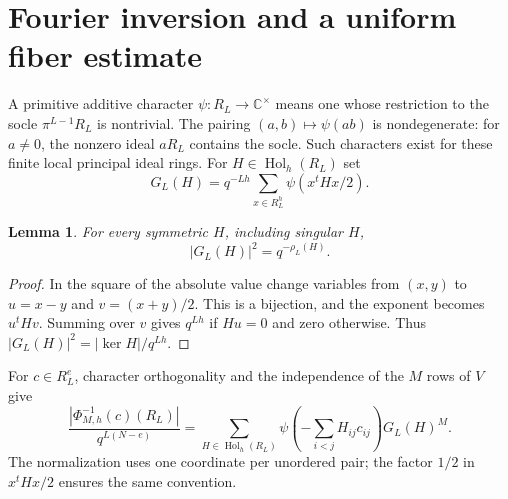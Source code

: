 \documentclass[11pt]{article}
\numberwithin{equation}{section}
\newtheorem{lemma}[theorem]{Lemma}
\theoremstyle{remark}
\newcommand{\C}{\mathbb C}
\newcommand{\Hol}{\operatorname{Hol}}
\begin{document}
\section{Fourier inversion and a uniform fiber estimate}
A primitive additive character $\psi:R_L\to\C^\times$ means one
whose restriction to the socle $\pi^{L-1}R_L$ is nontrivial.
The pairing $(a,b)\mapsto\psi(ab)$ is nondegenerate: for $a\ne0$,
the nonzero ideal $aR_L$ contains the socle. Such characters exist
for these finite local principal ideal rings.
For $H\in\Hol_h(R_L)$ set
\[
 G_L(H)=q^{-Lh}\sum_{x\in R_L^h}\psi(x^tHx/2).
\]

\begin{lemma}\label{lem:gauss}
For every symmetric $H$, including singular $H$,
\[
 |G_L(H)|^2=q^{-\rho_L(H)}.
\]
\end{lemma}
\begin{proof}
In the square of the absolute value change variables from $(x,y)$
to $u=x-y$ and $v=(x+y)/2$. This is a bijection, and the exponent
becomes $u^tHv$. Summing over $v$ gives $q^{Lh}$ if $Hu=0$ and
zero otherwise. Thus $|G_L(H)|^2=|\ker H|/q^{Lh}$.
\end{proof}

For $c\in R_L^e$, character orthogonality and the independence of
the $M$ rows of $V$ give
\begin{equation}\label{eq:Fourier}
 \frac{|\Phi_{M,h}^{-1}(c)(R_L)|}{q^{L(N-e)}}
   =\sum_{H\in\Hol_h(R_L)}
       \psi\left(-\sum_{i<j}H_{ij}c_{ij}\right)G_L(H)^M.
\end{equation}
The normalization uses one coordinate per unordered pair; the
factor $1/2$ in $x^tHx/2$ ensures the same convention.
\end{document}
